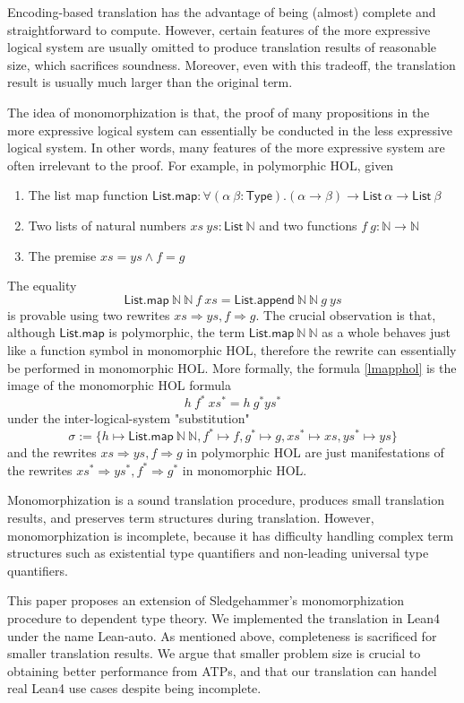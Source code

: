   Encoding-based translation has the advantage of being (almost) complete
  and straightforward to compute. However, certain features of the more expressive
  logical system are usually omitted to produce translation results of reasonable size,
  which sacrifices soundness. Moreover, even with this tradeoff, the translation result is usually much larger
  than the original term.

  The idea of monomorphization is that, the proof of many propositions in the more expressive logical
  system can essentially be conducted in the less expressive logical system. In other words,
  many features of the more expressive system are often irrelevant to the proof. For example,
  in polymorphic HOL, given
  \begin{enumerate}
    \item The list map function $\mathsf{List.map} : \forall (\alpha \ \beta : \mathsf{Type}). (\alpha \to \beta) \to \mathsf{List} \ \alpha \to \mathsf{List} \ \beta$
    \item Two lists of natural numbers $xs \ ys : \mathsf{List} \ \mathbb{N}$ and two functions $f \ g : \mathbb{N} \to \mathbb{N}$
    \item The premise $xs = ys \land f = g$
  \end{enumerate}
  The equality
  \begin{equation}\label{lmapphol}
    \mathsf{List.map} \ \mathbb{N} \ \mathbb{N} \ f \ xs = \mathsf{List.append} \ \mathbb{N} \ \mathbb{N} \ g \ ys
  \end{equation}
  is provable using two rewrites $xs \Rightarrow ys, f \Rightarrow g$. The crucial observation is that, although $\textsf{List.map}$ is polymorphic, the term
  $\mathsf{List.map} \ \mathbb{N} \ \mathbb{N}$ as a whole behaves just like a function symbol in monomorphic HOL,
  therefore the rewrite can essentially be performed in monomorphic HOL. More formally,
  the formula \eqref{lmapphol} is the image of the monomorphic HOL formula
  $$h \ f^* \ xs^* = h \ g^* ys^*$$
  under the inter-logical-system "substitution"
  $$\sigma := \{h \mapsto \mathsf{List.map} \ \mathbb{N} \ \mathbb{N},
    f^* \mapsto f, g^* \mapsto g, xs^* \mapsto xs, ys^* \mapsto ys\}$$
  and the rewrites $xs \Rightarrow ys, f \Rightarrow g$ in polymorphic HOL are just manifestations of the
  rewrites $xs^* \Rightarrow ys^*, f^* \Rightarrow g^*$ in monomorphic HOL.
  
  Monomorphization is a sound translation procedure, produces small translation results, and preserves
  term structures during translation. However, monomorphization is incomplete,
  because it has difficulty handling complex term structures such as existential
  type quantifiers and non-leading universal type quantifiers.

  This paper proposes an extension of Sledgehammer's monomorphization procedure
  to dependent type theory. We implemented the translation in Lean4 under the name Lean-auto.
  As mentioned above, completeness is sacrificed for smaller translation
  results. We argue that smaller problem size is crucial to obtaining better performance
  from ATPs, and that our translation can handel real Lean4 use cases despite being incomplete.
